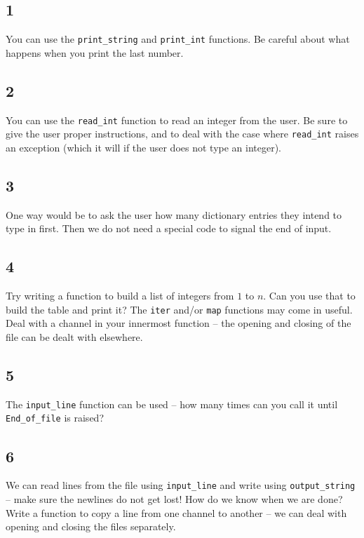 \documentclass[]{book}
\begin{document}
\subsection*{1}
You can use the \texttt{print\_string} and \texttt{print\_int} functions. Be careful about what happens when you print the last number.

\subsection*{2}
{\begin{sloppypar}You can use the \texttt{read\_int} function to read an integer from the user. Be sure to give the user proper instructions, and to deal with the case where \texttt{read\_int} raises an exception (which it will if the user does not type an integer).\end{sloppypar}}

\subsection*{3}
One way would be to ask the user how many dictionary entries they intend to type in first. Then we do not need a special code to signal the end of input.

\subsection*{4}
Try writing a function to build a list of integers from $1$ to $n$. Can you use that to build the table and print it? The \texttt{iter} and/or \texttt{map} functions may come in useful. Deal with a channel in your innermost function -- the opening and closing of the file can be dealt with elsewhere.

\subsection*{5}
The \texttt{input\_line} function can be used -- how many times can you call it until \texttt{End\_of\_file} is raised?

\subsection*{6}
We can read lines from the file using \texttt{input\_line} and write using \texttt{output\_string} -- make sure the newlines do not get lost! How do we know when we are done? Write a function to copy a line from one channel to another -- we can deal with opening and closing the files separately.
\end{document}
